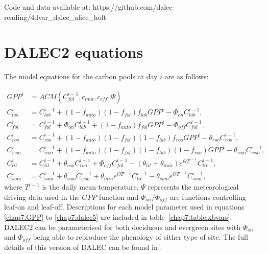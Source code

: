 Code and data available at: https://github.com/dalec-reading/4dvar\_dalec\_alice\_holt

\section{DALEC2 equations} \label{chap7:sec:dalec_eqns}

The model equations for the carbon pools at day $i$ are as follows:

\begin{align}
GPP^{i} &= ACM(C_{fol}^{i-1}, c_{lma}, c_{eff}, \Psi) \label{chap7:GPP}
\\C_{lab}^{i}&=C_{lab}^{i-1}+(1-f_{auto})(1-f_{fol})f_{lab}GPP^{i}-\Phi _{on}C_{lab}^{i-1}, \label{chap7:daleclab}
\\C_{fol}^{i}&=C_{fol}^{i-1}+\Phi_{on}C_{lab}^{i-1}+(1-f_{auto})f_{fol}GPP^{i}-\Phi_{off}C_{fol}^{i-1}, \label{chap7:dalec1}
\\C_{roo}^{i}&=C_{roo}^{i-1}+(1-f_{auto})(1-f_{fol})(1-f_{lab})f_{roo}GPP^{i}-\theta_{roo}C_{roo}^{i-1}, 
\\C_{woo}^{i}&=C_{woo}^{i-1}+(1-f_{auto})(1-f_{fol})(1-f_{lab})(1-f_{roo})GPP^{i}-\theta_{woo}C_{woo}^{i-1}, 
\\C_{lit}^{i}&=C_{lit}^{i-1}+\theta_{roo}C_{roo}^{i-1}+\Phi_{off}C_{fol}^{i-1}-(\theta_{lit}+\theta_{min})e^{\Theta T^{i-1}}C_{lit}^{i-1}, 
\\C_{som}^{i}&=C_{som}^{i-1}+\theta_{woo}C_{woo}^{i-1}+\theta_{min}e^{\Theta T^{i-1}}C_{lit}^{i-1}-\theta_{som}e^{\Theta T^{i-1}}C_{som}^{i-1}, \label{chap7:dalec5}
\end{align}
where $T^{i-1}$ is the daily mean temperature, $\Psi$ represents the meteorological driving data used in the $GPP$ function and $\Phi_{on} / \Phi_{off}$ are functions controlling leaf-on and leaf-off. Descriptions for each model parameter used in equations \eqref{chap7:GPP} to \eqref{chap7:dalec5} are included in table~\ref{chap7:table:xbvars}. DALEC2 can be parameterised for both deciduous and evergreen sites with $\Phi_{on}$ and $\Phi_{off}$ being able to reproduce the phenology of either type of site. The full details of this version of DALEC can be found in \cite{Bloom2015}. 

